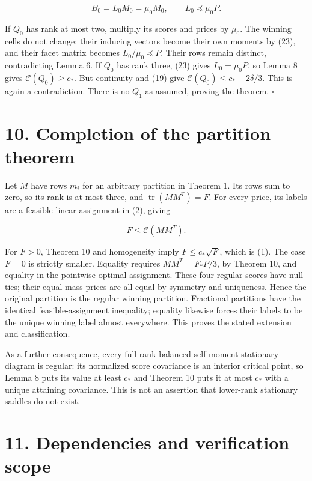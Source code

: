 \documentclass[
  11pt,
]{article}
\begin{document}
\[
 B_0=L_0M_0=\mu_0 M_0,\qquad L_0\preceq\mu_0P.         \tag{23}
\]

If \(Q_0\) has rank at most two, multiply its scores and prices by
\(\mu_0\). The winning cells do not change; their inducing vectors
become their own moments by (23), and their facet matrix becomes
\(L_0/\mu_0\preceq P\). Their rows remain distinct, contradicting Lemma
6. If \(Q_0\) has rank three, (23) gives \(L_0=\mu_0P\), so Lemma 8
gives \(\mathcal C(Q_0)\ge c_*\). But continuity and (19) give
\(\mathcal C(Q_0)\le c_*-2\delta/3\). This is again a contradiction.
There is no \(Q_1\) as assumed, proving the theorem. \(\square\)

\section{10. Completion of the partition
theorem}\label{completion-of-the-partition-theorem}

Let \(M\) have rows \(m_i\) for an arbitrary partition in Theorem 1. Its
rows sum to zero, so its rank is at most three, and
\(\operatorname{tr}(MM^T)=F\). For every price, its labels are a
feasible linear assignment in (2), giving

\[
 F\le\mathcal C(MM^T).
\]

For \(F>0\), Theorem 10 and homogeneity imply \(F\le c_*\sqrt F\), which
is (1). The case \(F=0\) is strictly smaller. Equality requires
\(MM^T=F_*P/3\), by Theorem 10, and equality in the pointwise optimal
assignment. These four regular scores have null ties; their equal-mass
prices are all equal by symmetry and uniqueness. Hence the original
partition is the regular winning partition. Fractional partitions have
the identical feasible-assignment inequality; equality likewise forces
their labels to be the unique winning label almost everywhere. This
proves the stated extension and classification.

As a further consequence, every full-rank balanced self-moment
stationary diagram is regular: its normalized score covariance is an
interior critical point, so Lemma 8 puts its value at least \(c_*\) and
Theorem 10 puts it at most \(c_*\) with a unique attaining covariance.
This is not an assertion that lower-rank stationary saddles do not
exist.

\section{11. Dependencies and verification
scope}\label{dependencies-and-verification-scope}
\end{document}
